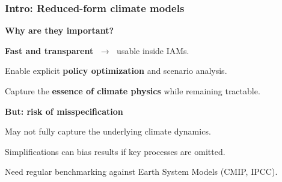 \documentclass[xcolor=x11names,compress,aspectratio=169]{beamer}%
\makeatletter
\renewenvironment{itemize}{\begin{compactitemize}[<+-| alert@+>]}{\end{compactitemize}}
\makeatother
\begin{document}
\begin{frame}%
%

\frametitle{Intro: Reduced-form climate models}%


\textbf{Why are they important?}

\begin{itemize}
\item \textbf{Fast and transparent} $\;\rightarrow\;$ usable inside IAMs.

\item Enable explicit \textbf{policy optimization} and scenario analysis.

\item Capture the \textbf{essence of climate physics} while remaining tractable.
\end{itemize}

\vspace{0.3cm} \textbf{But: risk of misspecification}

\begin{itemize}
\item May not fully capture the underlying climate dynamics.

\item Simplifications can bias results if key processes are omitted.

\item Need regular benchmarking against Earth System Models (CMIP, IPCC).
\end{itemize}

%

\transboxout
\end{frame}%
%

\fi
%
\end{document}

